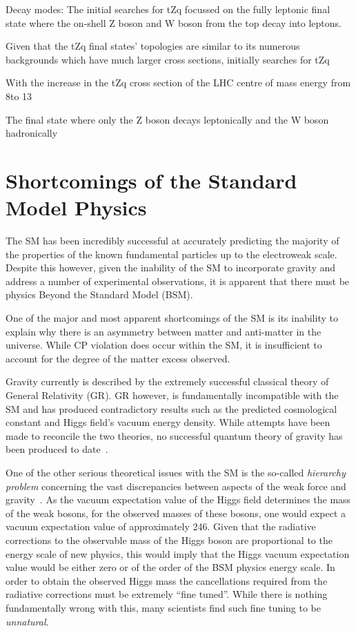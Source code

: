 Decay modes:
The initial searches for tZq focussed on the fully leptonic final state where the on-shell Z boson and W boson from the top decay into leptons.

Given that the tZq final states' topologies are similar to its numerous backgrounds which have much larger cross sections, initially searches for tZq 

With the increase in the tZq cross section 
of the LHC centre of mass energy from 8\TeV to 13\TeV

The final state where only the Z boson decays leptonically and the W boson hadronically


\section{Shortcomings of the Standard Model Physics}\label{sec:bsm}
The SM has been incredibly successful at accurately predicting the majority of the properties of the known fundamental particles up to the electroweak scale.
Despite this however, given the inability of the SM to incorporate gravity and address a number of experimental observations, it is apparent that there must be physics Beyond the Standard Model (BSM).

One of the major and most apparent shortcomings of the SM is its inability to explain why there is an asymmetry between matter and anti-matter in the universe.
While CP violation does occur within the SM, it is insufficient to account for the degree of the matter excess observed.

Gravity currently is described by the extremely successful classical theory of General Relativity (GR).
GR however, is fundamentally incompatible with the SM and  has produced contradictory results such as the predicted cosmological constant and Higgs field's vacuum energy density.
While attempts have been made to reconcile the two theories, no successful quantum theory of gravity has been produced to date~\cite{Sola:2013gha}.	

One of the other serious theoretical issues with the SM is the so-called \emph{hierarchy problem} concerning the vast discrepancies between aspects of the weak force and gravity~\cite{Burdman:2007ck}.
As the vacuum expectation value of the Higgs field determines the mass of the weak bosons, for the observed masses of these bosons, one would expect a vacuum expectation value of approximately 246\GeV.
Given that the radiative corrections to the observable mass of the Higgs boson are proportional to the energy scale of new physics, this would imply that the Higgs vacuum expectation value would be either zero or of the order of the BSM physics energy scale.
In order to obtain the observed Higgs mass the cancellations required from the radiative corrections must be extremely ``fine tuned''.
While there is nothing fundamentally wrong with this, many scientists find such fine tuning to be \emph{unnatural}.

